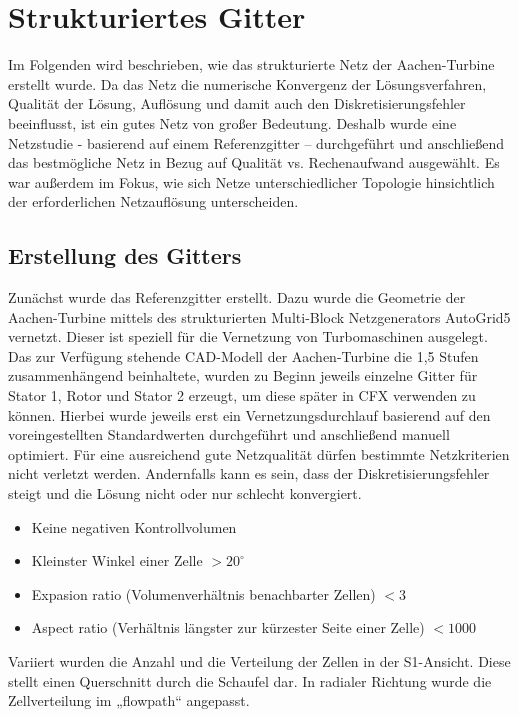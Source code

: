 \section{Strukturiertes Gitter}
Im Folgenden wird beschrieben, wie das strukturierte Netz der Aachen-Turbine erstellt wurde. Da das Netz die numerische Konvergenz der Lösungsverfahren, Qualität der Lösung, Auflösung und damit auch den Diskretisierungsfehler beeinflusst, ist ein gutes Netz von großer Bedeutung. Deshalb wurde eine Netzstudie - basierend auf einem Referenzgitter – durchgeführt und anschließend das bestmögliche Netz in Bezug auf Qualität vs. Rechenaufwand ausgewählt. Es war außerdem im Fokus, wie sich Netze unterschiedlicher Topologie hinsichtlich der erforderlichen Netzauflösung unterscheiden.

\subsection{Erstellung des Gitters}

Zunächst wurde das Referenzgitter erstellt. Dazu wurde die Geometrie der Aachen-Turbine mittels des strukturierten Multi-Block Netzgenerators AutoGrid5 vernetzt. Dieser ist speziell für die Vernetzung von Turbomaschinen ausgelegt. 
Das zur Verfügung stehende CAD-Modell der Aachen-Turbine die 1,5 Stufen zusammenhängend beinhaltete, wurden zu Beginn jeweils einzelne Gitter für Stator 1, Rotor und Stator 2 erzeugt, um diese später in CFX verwenden zu können. Hierbei wurde jeweils erst ein Vernetzungsdurchlauf basierend auf den voreingestellten Standardwerten durchgeführt und anschließend manuell optimiert. Für eine ausreichend gute Netzqualität dürfen bestimmte Netzkriterien nicht verletzt werden. Andernfalls kann es sein, dass der Diskretisierungsfehler steigt und die Lösung nicht oder nur schlecht konvergiert.
\begin{itemize}
	\item Keine negativen Kontrollvolumen
	\item Kleinster Winkel einer Zelle $> 20^\circ$
	\item Expasion ratio (Volumenverhältnis benachbarter Zellen) $< 3$
	\item Aspect ratio (Verhältnis längster zur kürzester Seite einer Zelle) $< 1000$ 
\end{itemize}
Variiert wurden die Anzahl und die Verteilung der Zellen in der S1-Ansicht. Diese stellt einen Querschnitt durch die Schaufel dar. In radialer Richtung wurde die Zellverteilung im „flowpath“ angepasst. 

